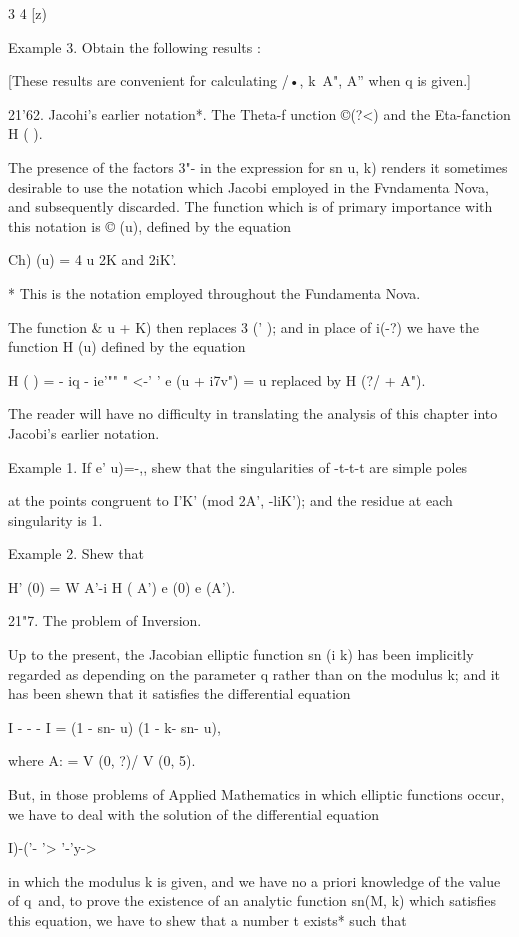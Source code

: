  3 4 [z)

Example 3. Obtain the following results :

[These results are convenient for calculating /•, k\ A", A'' when q is
given.]

21'62. Jacohi's earlier notation*. The Theta-f unction ©(?<) and the
Eta-fanction H ( ).

The presence of the factors 3"- in the expression for sn u, k) renders
it sometimes desirable to use the notation which Jacobi employed in
the Fvndamenta Nova, and subsequently discarded. The function which is
of primary importance with this notation is © (u), defined by the
equation

Ch) (u) = 4 u%
2K and 2iK'.

* This is the notation employed throughout the Fundamenta Nova.

%
%

The function \& u + K) then replaces 3 (' ); and in place of i(-?) we
have the function H (u) defined by the equation

H ( ) = - iq - ie'"" " <-' ' e (u + i7v") = u%
replaced by H (?/ + A").

The reader will have no difficulty in translating the analysis of this
chapter into Jacobi's earlier notation.

Example 1. If e' u)=-,, shew that the singularities of -t-t-t are
simple poles

at the points congruent to I'K' (mod 2A', -liK'); and the residue at
each singularity is 1.

Example 2. Shew that

H' (0) = W A'-i H ( A') e (0) e (A').

21"7. The problem of Inversion.

Up to the present, the Jacobian elliptic function sn (i k) has been
implicitly regarded as depending on the parameter q rather than on the
modulus k; and it has been shewn that it satisfies the differential
equation

I - - - I = (1 - sn- u) (1 - k- sn- u),

where A: = V (0, ?)/ V (0, 5).

But, in those problems of Applied Mathematics in which elliptic
functions occur, we have to deal with the solution of the differential
equation

 I)-('- '> '-'y->

in which the modulus k is given, and we have no a priori knowledge of
the value of q\ and, to prove the existence of an analytic function
sn(M, k) which satisfies this equation, we have to shew that a number
t exists* such that

